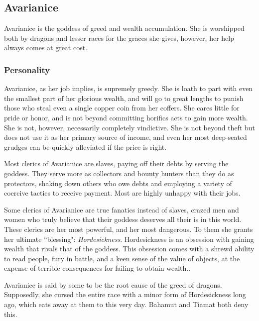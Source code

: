 \subsection*{Avarianice}
\begin{goddesc}
\end{goddesc}
Avarianice is the goddess of greed and wealth accumulation.
She is worshipped both by dragons and lesser races for the graces she gives, however, her help always comes at great cost.

\subsubsection*{Personality}
Avarianice, as her job implies, is supremely greedy.
She is loath to part with even the smallest part of her glorious wealth, and will go to great lengths to punish those who steal even a single copper coin from her coffers.
She cares little for pride or honor, and is not beyond committing horifics acts to gain more wealth.
She is not, however, necessarily completely vindictive.
She is not beyond theft but does not use it as her primary source of income, and even her most deep-seated grudges can be quickly alleviated if the price is right.

Most clerics of Avarianice are slaves, paying off their debts by serving the goddess.
They serve more as collectors and bounty hunters than they do as protectors, shaking down others who owe debts and employing a variety of coercive tactics to receive payment.
Most are highly unhappy with their jobs.

Some clerics of Avarianice are true fanatics instead of slaves, crazed men and women who truly believe that their goddess deserves all their is in this world.
These clerics are her most powerful, and her most dangerous.
To them she grants her ultimate ``blessing": \textit{Hordesickness}.
Hordesickness is an obsession with gaining wealth that rivals that of the goddess.
This obsession comes with a shrewd ability to read people, fury in battle, and a keen sense of the value of objects, at the expense of terrible consequences for failing to obtain wealth..

Avarianice is said by some to be the root cause of the greed of dragons.
Supposedly, she cursed the entire race with a minor form of Hordesickness long ago, which eats away at them to this very day.
Bahamut and Tiamat both deny this.

